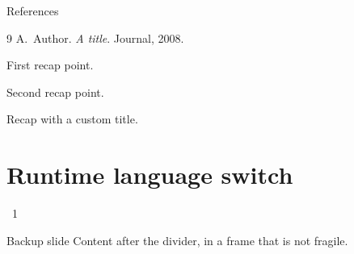 \documentclass[aspectratio=169,10pt]{beamer}
\begin{document}
\begin{frame}{References}
  \begin{thebibliography}{9}
     A.~Author. \emph{A title}. Journal, 2008.
  \end{thebibliography}
\end{frame}

\thbclosingframe
{}

\begin{closing}
  \item First recap point.
  \item Second recap point.
\end{closing}

\begin{closing}[Discussion]
  \item Recap with a custom title.
\end{closing}

\section{Runtime language switch}
\thbagenda
\thboutlinecompact
\begin{frame}{}
  ~1 \textperiodcentered\  \textperiodcentered\ 
\end{frame}
\thbagenda
\thbclosingframe
{}

\thbbackup
\begin{frame}{Backup slide}
  Content after the  divider, in a frame that is not fragile.
\end{frame}
\end{document}
